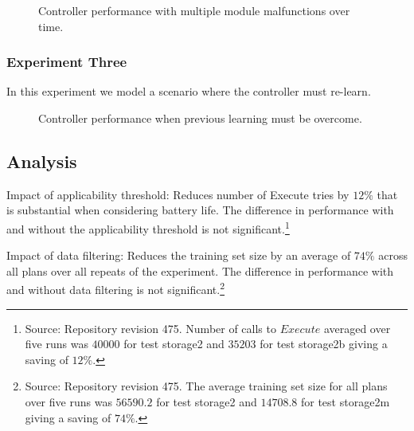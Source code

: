 \begin{figure}[ht]
\begin{center}

\end{center}
\caption{Controller performance with multiple module malfunctions over time.}
\label{fig:experiment2}
\end{figure}

\subsubsection{Experiment Three}

In this experiment we model a scenario where the controller must re-learn.

\begin{figure}[ht]
\begin{center}

\end{center}
\caption{Controller performance when previous learning must be overcome.}
\label{fig:experiment3}
\end{figure}



\subsection{Analysis}\label{subsec:analysis}

Impact of applicability threshold: Reduces number of Execute tries by $12\%$ that is substantial when considering battery life. The difference in performance with and without the applicability threshold is not significant.\footnote{Source: Repository revision 475. Number of calls to $Execute$ averaged over five runs was $40000$ for test storage2 and $35203$ for test storage2b giving a saving of $12\%$.}

Impact of data filtering: Reduces the training set size by an average of $74\%$ across all plans over all repeats of the experiment. The difference in performance with and without data filtering is not significant.\footnote{Source: Repository revision 475. The average training set size for all plans over five runs was $56590.2$ for test storage2 and $14708.8$ for test storage2m giving a saving of $74\%$.}


